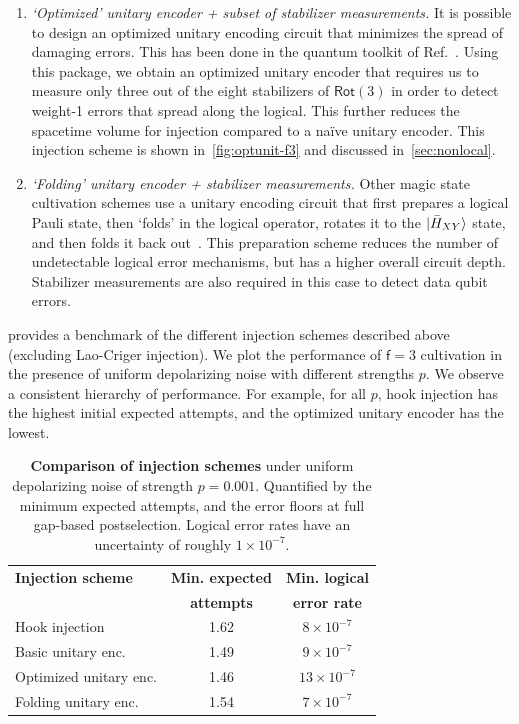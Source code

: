 \documentclass[%
    aps, 
    physrev,
    reprint,
]{revtex4-2}
\newcommand{\fd}[1]{\mathsf{f}=#1}
\newcommand{\rot}[1]{\mathsf{Rot}(#1)}
\begin{document}
\begin{enumerate}
    \item \textit{`Optimized' unitary encoder + subset of stabilizer measurements.} 
    It is possible to design an optimized unitary encoding circuit that minimizes the spread of damaging errors. 
    This has been done in the quantum toolkit of Ref.~\cite{mqt2024}. 
    Using this package, we obtain an optimized unitary encoder that requires us to measure only three out of the eight stabilizers of $\rot3$ in order to detect weight-1 errors that spread along the logical.
    This further reduces the spacetime volume for injection compared to a na\"ive unitary encoder.
    This injection scheme is shown in~\cref{fig:optunit-f3} and discussed in~\cref{sec:nonlocal}.
    \item \textit{`Folding' unitary encoder + stabilizer measurements.} 
    Other magic state cultivation schemes use a unitary encoding circuit that first prepares a logical Pauli state, then `folds' in the logical operator, rotates it to the $\ket{\bar{H}_{XY}}$ state, and then folds it back out~\cite{gidney2024magic, claes2025cultivatingtstatessurface, vaknin2025magic}.
    This preparation scheme reduces the number of undetectable logical error mechanisms, but has a higher overall circuit depth. Stabilizer measurements are also required in this case to detect data qubit errors.
    
\end{enumerate}

 provides a benchmark of the different injection schemes described above (excluding Lao-Criger injection).
{We plot the performance of $\fd3$ cultivation in the presence of uniform depolarizing noise with different strengths $p$.}
{We observe a consistent hierarchy of performance.}
For example, for all $p$, hook injection has the highest initial expected attempts, and the optimized unitary encoder has the lowest.

\begin{table}
    \centering
    \begin{tabular}{|l|c|c|}
        \hline
        \textbf{Injection scheme} & \textbf{Min. expected} & \textbf{Min. logical} \\
        & \textbf{attempts} & \textbf{error rate} \\
        \hline
        Hook injection & 1.62 & $8 \times 10^{-7} $\\
        Basic unitary enc. & 1.49 & $9 \times 10^{-7} $ \\
        Optimized unitary enc. & 1.46 & $13 \times 10^{-7} $ \\
        Folding unitary enc. & 1.54 & $7 \times 10^{-7} $ \\
        \hline
    \end{tabular}
    \caption{
        \textbf{Comparison of injection schemes} under uniform depolarizing noise of strength $p=0.001$.
        Quantified by the minimum expected attempts, and the error floors at full gap-based postselection. 
        Logical error rates have an uncertainty of roughly $1 \times 10^{-7}$.
        }
    \label{tab:floors}
\end{table}
\end{document}
